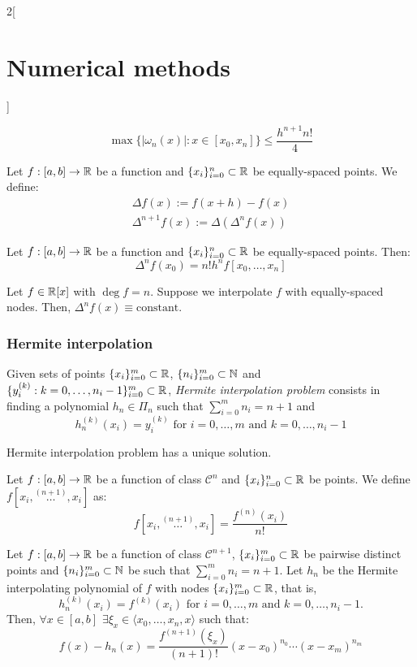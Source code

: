 \documentclass[../../../main.tex]{subfiles}
\begin{document}
\begin{multicols}{2}[\section{Numerical methods}]
\begin{prop}
    $$\max\{|\omega_n(x)|:x\in[x_0,x_n]\}\leq\frac{h^{n+1}n!}{4}$$
  \end{prop}
  \begin{definition}
    Let $f:[a,b]\rightarrow\mathbb{R}$ be a function and $\{x_i\}_{i=0}^n\subset\mathbb{R}$ be equally-spaced points. We define:
    \begin{gather*}
      \Delta f(x):=f(x+h)-f(x)\\
      \Delta^{n+1}f(x):=\Delta(\Delta^nf(x))
    \end{gather*}
  \end{definition}
  \begin{lemma}
    Let $f:[a,b]\rightarrow\mathbb{R}$ be a function and $\{x_i\}_{i=0}^n\subset\mathbb{R}$ be equally-spaced points. Then: $$\Delta^nf(x_0)=n!h^nf[x_0,\ldots,x_n]$$
  \end{lemma}
  \begin{corollary}
    Let $f\in\mathbb{R}[x]$ with $\deg f=n$. Suppose we interpolate $f$ with equally-spaced nodes. Then, $\Delta^nf(x)\equiv\text{constant}$.
  \end{corollary}
  \subsubsection{Hermite interpolation}
  \begin{definition}
    Given sets of points $\{x_i\}_{i=0}^m\subset\mathbb{R}$, $\{n_i\}_{i=0}^m\subset\mathbb{N}$ and $\{y_i^{(k)}:k=0,\ldots,n_i-1\}_{i=0}^m\subset\mathbb{R}$, \textit{Hermite interpolation problem} consists in finding a polynomial $h_n\in\Pi_n$ such that $\sum_{i=0}^mn_i=n+1$ and $$h_n^{(k)}(x_i)=y_i^{(k)}\text{ for }i=0,\ldots,m\text{ and }k=0,\ldots,n_i-1$$
  \end{definition}
  \begin{prop}
    Hermite interpolation problem has a unique solution.
  \end{prop}
  \begin{definition}
    Let $f:[a,b]\rightarrow\mathbb{R}$ be a function of class $\mathcal{C}^n$ and $\{x_i\}_{i=0}^n\subset\mathbb{R}$ be points. We define $f[x_i,\overset{(n+1)}{\ldots},x_i]$ as: $$f[x_i,\overset{(n+1)}{\ldots},x_i]=\frac{f^{(n)}(x_i)}{n!}$$
  \end{definition}
  \begin{theorem}
    Let $f:[a,b]\rightarrow\mathbb{R}$ be a function of class $\mathcal{C}^{n+1}$, $\{x_i\}_{i=0}^m\subset\mathbb{R}$ be pairwise distinct points and $\{n_i\}_{i=0}^m\subset\mathbb{N}$ be such that $\sum_{i=0}^mn_i=n+1$. Let $h_n$ be the Hermite interpolating polynomial of $f$ with nodes $\{x_i\}_{i=0}^m\subset\mathbb{R}$, that is, $$h_n^{(k)}(x_i)=f^{(k)}(x_i)\text{ for }i=0,\ldots,m\text{ and }k=0,\ldots,n_i-1.$$ Then, $\forall x\in[a,b]$ $\exists\xi_x\in\langle x_0,\ldots,x_n,x\rangle$ such that: $$f(x)-h_n(x)=\frac{f^{(n+1)}(\xi_x)}{(n+1)!}(x-x_0)^{n_0}\cdots(x-x_m)^{n_m}$$
  \end{theorem}

\end{multicols}
\end{document}
